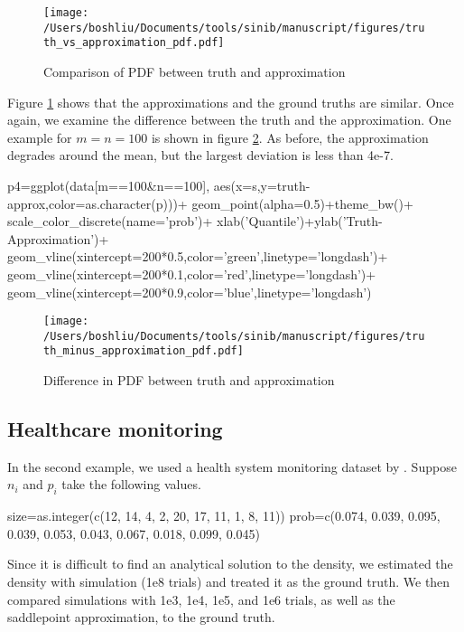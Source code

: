 \begin{figure}[h]
\texttt{[image: /Users/boshliu/Documents/tools/sinib/manuscript/figures/truth\_vs\_approximation\_pdf.pdf]}
\caption{Comparison of PDF between truth and approximation}
\label{fig:3}
\end{figure}

Figure \ref{fig:3} shows that the approximations and the ground truths are similar. Once again, we examine the difference between the truth and the approximation. One example for $m=n=100$ is shown in figure \ref{fig:4}. As before, the approximation degrades around the mean, but the largest deviation is less than 4e-7.


\begin{example}
p4=ggplot(data[m==100&n==100],
	aes(x=s,y=truth-approx,color=as.character(p)))+
	geom_point(alpha=0.5)+theme_bw()+
	scale_color_discrete(name='prob')+
	xlab('Quantile')+ylab('Truth-Approximation')+
	geom_vline(xintercept=200*0.5,color='green',linetype='longdash')+
	geom_vline(xintercept=200*0.1,color='red',linetype='longdash')+
	geom_vline(xintercept=200*0.9,color='blue',linetype='longdash')
\end{example}

\begin{figure}[h]
\texttt{[image: /Users/boshliu/Documents/tools/sinib/manuscript/figures/truth\_minus\_approximation\_pdf.pdf]}
\caption{Difference in PDF between truth and approximation}
\label{fig:4}
\end{figure}


\subsection{Healthcare monitoring}
In the second example, we used a health system monitoring dataset by \cite{Benneyan:2010ex}. Suppose $n_i$ and $p_i$ take the following values. 

\begin{example}
size=as.integer(c(12, 14, 4, 2, 20, 17, 11, 1, 8, 11))
prob=c(0.074, 0.039, 0.095, 0.039, 0.053, 0.043, 0.067, 0.018, 0.099, 0.045)
\end{example}

Since it is difficult to find an analytical solution to the density, we estimated the density with simulation (1e8 trials) and treated it as the ground truth. We then compared simulations with 1e3, 1e4, 1e5, and 1e6 trials, as well as the saddlepoint approximation, to the ground truth. 

